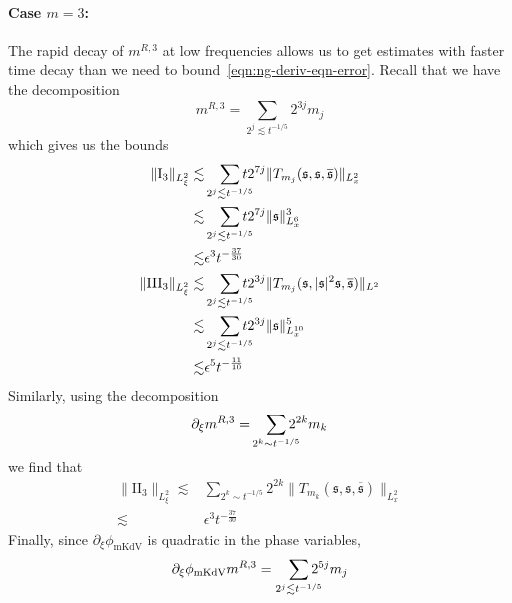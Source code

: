 \documentclass[letterpaper, reqno,final]{amsart}
\newcommand{\fs}{\mathfrak{s}}
\newcommand{\rmI}{\mathrm{I}}
\newcommand{\rmII}{\mathrm{II}}
\newcommand{\rmIII}{\mathrm{III}}
\newcommand{\tmkdv}{\text{mKdV}}
\begin{document}
\paragraph{\textbf{Case $m=3$}:}  The rapid decay of $m^{R,3}$ at low frequencies allows us to get estimates with faster time decay than we need to bound~\eqref{eqn:ng-deriv-eqn-error}.  Recall that we have the decomposition
\begin{equation*}
    m^{R,3} = \sum_{2^j \lesssim t^{-{1/5}}} 2^{3j} m_j
\end{equation*}
which gives us the bounds
\begin{equation*}\begin{split}
    \lVert \rmI_3 \rVert_{L^2_\xi} \lesssim& \smashoperator[r]{\sum_{2^j \lesssim t^{-{1/5}}}} t2^{7j} \lVert T_{m_j}(\fs, \fs, \overline{\fs}) \rVert_{L^2_x}\\
    \lesssim& \smashoperator[r]{\sum_{2^j \lesssim t^{-{1/5}}}} t2^{7j} \lVert \fs \rVert_{L^6_x}^3\\
    \lesssim& \epsilon^3 t^{-\frac{37}{30}}\\
    \lVert \rmIII_3 \rVert_{L^2_\xi} \lesssim& \smashoperator[r]{\sum_{2^j \lesssim t^{-1/5}}} t2^{3j} \lVert T_{m_j}(\fs, |\fs|^2\fs, \overline{\fs}) \rVert_{L^2}\\
    \lesssim& \smashoperator[r]{\sum_{2^j \lesssim t^{-1/5}}} t2^{3j} \lVert \fs \rVert_{L^{10}_x}^5\\
    \lesssim& \epsilon^5 t^{-\frac{11}{10}}
\end{split}\end{equation*}
Similarly, using the decomposition
\begin{equation*}\begin{split}
    \partial_\xi m^{R,3} =& \smashoperator[r]{\sum_{2^k \sim t^{-{1/5}}}} 2^{2k} m_k\\
\end{split}\end{equation*}
we find that
\begin{equation*}\begin{split}
    \lVert \rmII_3 \rVert_{L^2_\xi} \lesssim& \sum_{2^k \sim t^{-{1/5}}} 2^{2k} \lVert T_{m_k}(\fs, \fs, \overline{\fs}) \rVert_{L^2_x}\\
    \lesssim& \epsilon^3 t^{-\frac{37}{30}}
\end{split}\end{equation*}
Finally, since $\partial_\xi \phi_{\tmkdv}$ is quadratic in the phase variables,
\begin{equation*}
    \partial_{\xi} \phi_{\tmkdv} m^{R,3} = \smashoperator[r]{\sum_{2^j \lesssim t^{-1/5}}} 2^{5j} m_j
\end{equation*}
\end{document}
